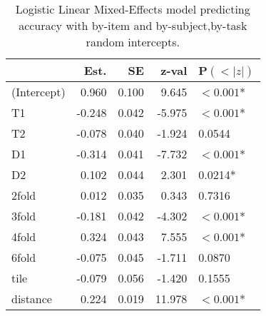 \begin{table}
\centering
\begin{tabular}{|l|rrrl|}
\hline
& Est. & SE & z-val & P$(<|z|)$  \\ \hline
(Intercept) & 0.960 &  0.100 & 9.645 & $<0.001$* \\ \hline
T1 & -0.248 &  0.042 & -5.975 &  $<0.001$* \\ \hline
T2 & -0.078 & 0.040 & -1.924 & 0.0544 \\ \hline
D1 & -0.314 & 0.041 & -7.732 &  $<0.001$* \\ \hline
D2 & 0.102 & 0.044 & 2.301 & 0.0214* \\ \hline
2fold & 0.012 & 0.035 & 0.343 & 0.7316 \\ \hline
3fold & -0.181 & 0.042 & -4.302 & $<0.001$* \\ \hline
4fold & 0.324 & 0.043 & 7.555 & $<0.001$* \\ \hline
6fold & -0.075 & 0.045 & -1.711 & 0.0870 \\ \hline
tile & -0.079 & 0.056 & -1.420 & 0.1555 \\ \hline
distance & 0.224 & 0.019 & 11.978 & $<0.001$*\\ \hline
\end{tabular}
\caption{Logistic Linear Mixed-Effects model predicting accuracy with by-item and by-subject,by-task random intercepts. }
\label{fixeff}
\end{table}